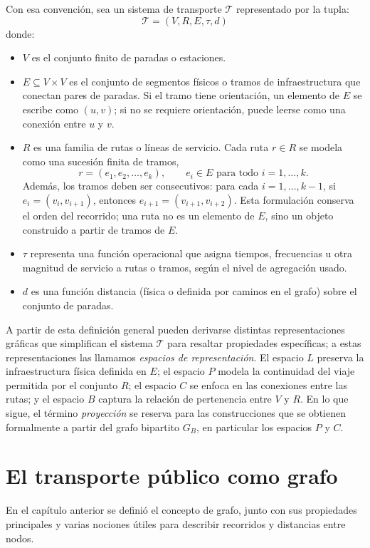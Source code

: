     Con esa convención, sea un sistema de transporte $\mathcal{T}$ representado por la tupla:
    \[
    \mathcal{T} = (V, R, E, \tau, d)
    \]
    donde:
    \begin{itemize}
        \item $V$ es el conjunto finito de paradas o estaciones.
        \item $E\subseteq V\times V$ es el conjunto de segmentos físicos o tramos de infraestructura que conectan pares de paradas. Si el tramo tiene orientación, un elemento de $E$ se escribe como $(u,v)$; si no se requiere orientación, puede leerse como una conexión entre $u$ y $v$.
        \item $R$ es una familia de rutas o líneas de servicio. Cada ruta $r\in R$ se modela como una sucesión finita de tramos,
        \[
            r=(e_1,e_2,\ldots,e_k),
            \qquad e_i\in E \text{ para todo } i=1,\ldots,k.
        \]
        Además, los tramos deben ser consecutivos: para cada $i=1,\ldots,k-1$, si $e_i=(v_i,v_{i+1})$, entonces $e_{i+1}=(v_{i+1},v_{i+2})$. Esta formulación conserva el orden del recorrido; una ruta no es un elemento de $E$, sino un objeto construido a partir de tramos de $E$.
        \item $\tau$ representa una función operacional que asigna tiempos, frecuencias u otra magnitud de servicio a rutas o tramos, según el nivel de agregación usado.
        \item $d$ es una función distancia (física o definida por caminos en el grafo) sobre el conjunto de paradas.
    \end{itemize}

    A partir de esta definición general pueden derivarse distintas representaciones gráficas que simplifican el sistema $\mathcal{T}$ para resaltar propiedades específicas; a estas representaciones las llamamos \textit{espacios de representación}. El espacio $L$ preserva la infraestructura física definida en $E$; el espacio $P$ modela la continuidad del viaje permitida por el conjunto $R$; el espacio $C$ se enfoca en las conexiones entre las rutas; y el espacio $B$ captura la relación de pertenencia entre $V$ y $R$. En lo que sigue, el término \textit{proyección} se reserva para las construcciones que se obtienen formalmente a partir del grafo bipartito $G_B$, en particular los espacios $P$ y $C$.

    \section{El transporte público como grafo}
        En el capítulo anterior se definió el concepto de grafo, junto con sus propiedades principales y varias nociones útiles para describir recorridos y distancias entre nodos.

